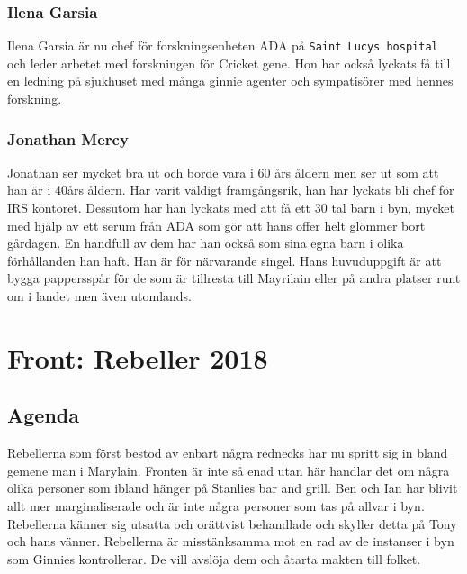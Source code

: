 \documentclass[a5paper,10pt]{report}
\begin{document}
\subsubsection{Ilena Garsia}
Ilena Garsia är nu chef för forskningsenheten ADA på \texttt{Saint Lucys hospital} och leder arbetet med forskningen för Cricket gene. Hon har också lyckats få till en ledning på sjukhuset med många ginnie agenter och sympatisörer med hennes forskning.
\subsubsection{Jonathan Mercy}
Jonathan ser mycket bra ut och borde vara i 60 års åldern men ser ut som att han är i 40års åldern. Har varit väldigt framgångsrik, han har lyckats bli chef för IRS kontoret. Dessutom har han lyckats med att få ett 30 tal barn i byn, mycket med hjälp av ett serum från ADA som gör att hans offer helt glömmer bort gårdagen. En handfull av dem har han också som sina egna barn i olika förhållanden han haft. Han är för närvarande singel. Hans huvuduppgift är att bygga pappersspår för de som är tillresta till Mayrilain eller på andra platser runt om i landet men även utomlands.
\section{Front: Rebeller 2018}
\subsection{Agenda}
Rebellerna som först bestod av enbart några rednecks har nu spritt sig in bland gemene man i Marylain. Fronten är inte så enad utan här handlar det om några olika personer som ibland hänger på Stanlies bar and grill. Ben och Ian har blivit allt mer marginaliserade och är inte några personer som tas på allvar i byn. Rebellerna känner sig utsatta och orättvist behandlade och skyller detta på Tony och hans vänner. Rebellerna är misstänksamma mot en rad av de instanser i byn som Ginnies kontrollerar. De vill avslöja dem och åtarta makten till folket.
\end{document}
